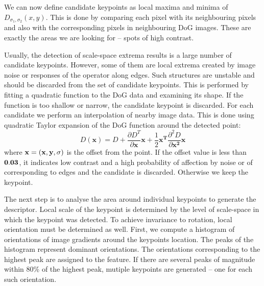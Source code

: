  We can now define candidate keypoints as local maxima and minima of $D_{\sigma_1,\sigma_2}(x, y)$.
This is done by comparing each pixel with its neighbouring pixels and also with the corresponding pixels in neighbouring DoG images. 
These are exactly the areas we are looking for -- spots of high contrast. %

Usually, the detection of scale-space extrema results is a large number of candidate keypoints.
However, some of them are local extrema created by image noise or responses of the operator along edges. 
Such structures are unstable and should be discarded from the set of candidate keypoints.
This is performed by fitting a quadratic function to the DoG data and examining its shape. 
If the function is too shallow or narrow, the candidate keypoint is discarded. 
For each candidate we perform an interpolation of nearby image data. %
This is done using quadratic Taylor expansion of the DoG function around the detected point:
\[
D(\mathbf{x}) = D + \frac{\partial D^{T}}{\partial \mathbf{x}}\mathbf{x} + \frac{1}{2}\mathbf{x^{T}}\frac{\partial ^{2}D}{\partial \mathbf{x^{2}}}\mathbf{x}
\]
where $\mathbf{\mathbf{x} = (x, y, \sigma)}$ is the offset from the point.
If the offset value is less than $\mathbf{0.03}$, it indicates low contrast and a high probability of affection by noise or of corresponding to edges and the candidate is discarded.
Otherwise we keep the keypoint.

The next step is to analyse the area around individual keypoints to generate the descriptor. 
Local scale of the keypoint is determined by the level of scale-space in which the keypoint was detected. 
To achieve invariance to rotation, local orientation must be determined as well. 
First, we compute a histogram of orientations of image gradients around the keypoints location.
The peaks of the histogram represent dominant orientations.
The orientations corresponding to the highest peak are assigned to the feature. 
If there are several peaks of magnitude within 80\% of the highest peak, mutiple keypoints are generated -- one for each such orientation.

